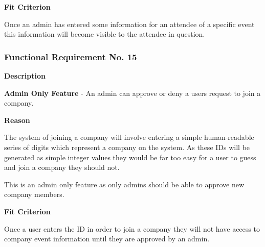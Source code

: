 \textbf{Fit Criterion}

Once an admin has entered some information for an attendee  of a specific event this information will become visible to the attendee in question.

\subsubsection{Functional Requirement No. 15}

\textbf{Description}

\textbf{Admin Only Feature} - An admin can approve or deny a users request to join a company.

\textbf{Reason}

The system of joining a company will involve entering a simple human-readable series of digits which represent a company on the system. As these IDs will be generated as simple integer values they would be far too easy for a user to guess and join a company they should not.

This is an admin only feature as only admins should be able to approve new company members.

\textbf{Fit Criterion}

Once a user enters the ID in order to join a company they will not have access to company event information until they are approved by an admin.


